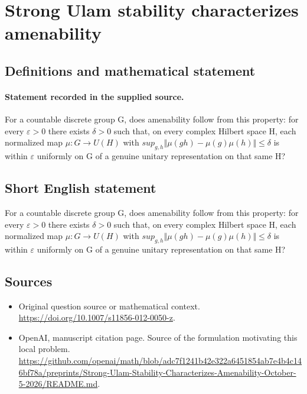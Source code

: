 \documentclass[11pt]{article}
\begin{document}
\section*{Strong Ulam stability characterizes amenability}\label{statement}
\subsection{Definitions and mathematical statement}
\paragraph{Statement recorded in the supplied source.}
For a countable discrete group G, does amenability follow from this property: for every $\varepsilon >0$ there exists $\delta >0$ such that, on every complex Hilbert space H, each normalized map $\mu :G\to U(H)$ with $sup_{g,h}\Vert \mu (gh)-\mu (g)\mu (h)\Vert \leq \delta $ is within $\varepsilon $ uniformly on G of a genuine unitary representation on that same H?
\subsection{Short English statement}
For a countable discrete group G, does amenability follow from this property: for every $\varepsilon >0$ there exists $\delta >0$ such that, on every complex Hilbert space H, each normalized map $\mu :G\to U(H)$ with $sup_{g,h}\Vert \mu (gh)-\mu (g)\mu (h)\Vert \leq \delta $ is within $\varepsilon $ uniformly on G of a genuine unitary representation on that same H?
\subsection{Sources}
\begin{itemize}
\item[S1] Original question source or mathematical context.
\url{https://doi.org/10.1007/s11856-012-0050-z}.
\item[S2] OpenAI, manuscript citation page. Source of the formulation motivating this local problem.
\url{https://github.com/openai/math/blob/adc7f1241b42e322a6451854ab7e4b4c146bf78a/preprints/Strong-Ulam-Stability-Characterizes-Amenability-October-5-2026/README.md}.
\end{itemize}
\end{document}
